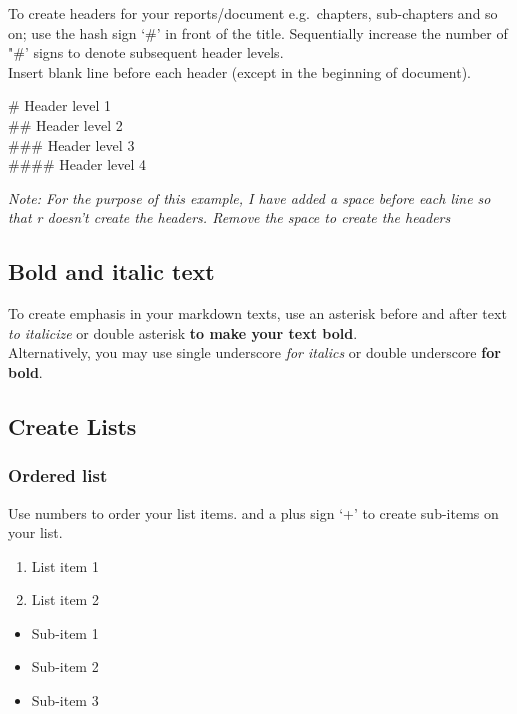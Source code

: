 \documentclass[
]{book}
\providecommand{\tightlist}{%
  \setlength{\itemsep}{0pt}\setlength{\parskip}{0pt}}
\begin{document}
To create headers for your reports/document e.g.~chapters, sub-chapters and so on; use the hash sign `\#' in front of the title. Sequentially increase the number of "\#' signs to denote subsequent header levels.\\
Insert blank line before each header (except in the beginning of document).

\# Header level 1\\
\#\# Header level 2\\
\#\#\# Header level 3\\
\#\#\#\# Header level 4

\emph{Note: For the purpose of this example, I have added a space before each line so that r doesn't create the headers. Remove the space to create the headers}

\hypertarget{bold-and-italic-text}{%
\subsection{Bold and italic text}\label{bold-and-italic-text}}

To create emphasis in your markdown texts, use an asterisk before and after text \emph{to italicize} or double asterisk \textbf{to make your text bold}.\\
Alternatively, you may use single underscore \emph{for italics} or double underscore \textbf{for bold}.

\hypertarget{create-lists}{%
\subsection{Create Lists}\label{create-lists}}

\hypertarget{ordered-list}{%
\subsubsection{Ordered list}\label{ordered-list}}

Use numbers to order your list items.
and a plus sign `+' to create sub-items on your list.

\begin{enumerate}
\def\labelenumi{\arabic{enumi}.}
\tightlist
\item
  List item 1\\
\item
  List item 2\\
\end{enumerate}

\begin{itemize}
\tightlist
\item
  Sub-item 1\\
\item
  Sub-item 2\\
\item
  Sub-item 3\\
\end{itemize}
\end{document}
